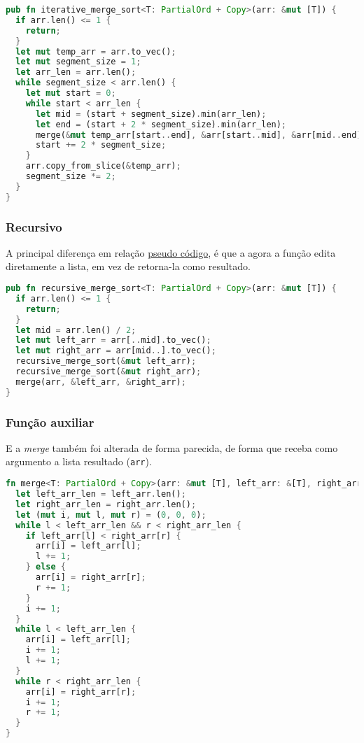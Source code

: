 \begin{lstlisting}[language=Rust]
pub fn iterative_merge_sort<T: PartialOrd + Copy>(arr: &mut [T]) {
  if arr.len() <= 1 {
    return;
  }
  let mut temp_arr = arr.to_vec();
  let mut segment_size = 1;
  let arr_len = arr.len();
  while segment_size < arr.len() {
    let mut start = 0;
    while start < arr_len {
      let mid = (start + segment_size).min(arr_len);
      let end = (start + 2 * segment_size).min(arr_len);
      merge(&mut temp_arr[start..end], &arr[start..mid], &arr[mid..end]);
      start += 2 * segment_size;
    }
    arr.copy_from_slice(&temp_arr);
    segment_size *= 2;
  }
}
\end{lstlisting}

\subsubsection{Recursivo}

A principal diferença em relação \href{algo:merge_sort_pseudo}{pseudo código}, é que a agora a função edita diretamente a lista, em vez de retorna-la como resultado.

\begin{lstlisting}[language=Rust]
pub fn recursive_merge_sort<T: PartialOrd + Copy>(arr: &mut [T]) {
  if arr.len() <= 1 {
    return;
  }
  let mid = arr.len() / 2;
  let mut left_arr = arr[..mid].to_vec();
  let mut right_arr = arr[mid..].to_vec();
  recursive_merge_sort(&mut left_arr);
  recursive_merge_sort(&mut right_arr);
  merge(arr, &left_arr, &right_arr);
}
\end{lstlisting}
\FloatBarrier

\subsubsection{Função auxiliar}

E a \textit{merge} também foi alterada de forma parecida, de forma que receba como argumento a lista resultado (\texttt{arr}).

\begin{lstlisting}[language=Rust]
fn merge<T: PartialOrd + Copy>(arr: &mut [T], left_arr: &[T], right_arr: &[T]) {
  let left_arr_len = left_arr.len();
  let right_arr_len = right_arr.len();
  let (mut i, mut l, mut r) = (0, 0, 0);
  while l < left_arr_len && r < right_arr_len {
    if left_arr[l] < right_arr[r] {
      arr[i] = left_arr[l];
      l += 1;
    } else {
      arr[i] = right_arr[r];
      r += 1;
    }
    i += 1;
  }
  while l < left_arr_len {
    arr[i] = left_arr[l];
    i += 1;
    l += 1;
  }
  while r < right_arr_len {
    arr[i] = right_arr[r];
    i += 1;
    r += 1;
  }
}
\end{lstlisting}


